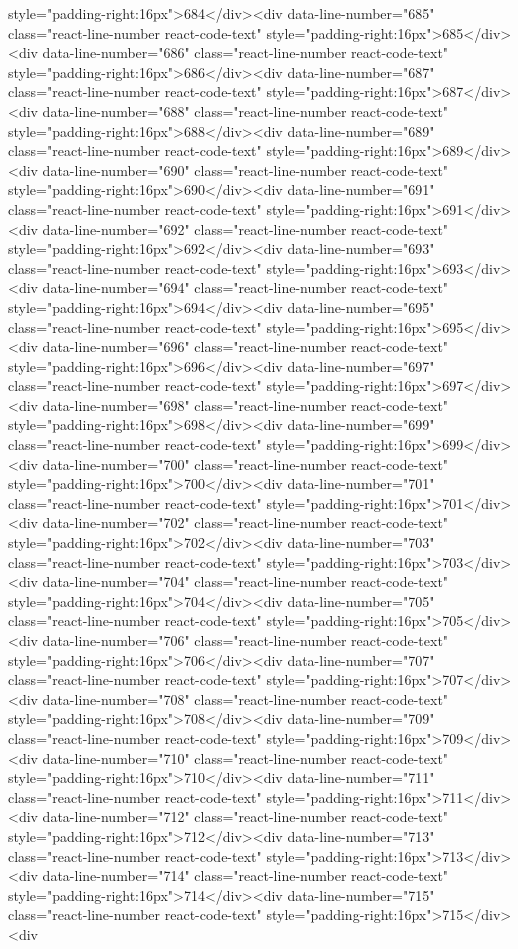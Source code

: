 style="padding-right:16px">684</div><div data-line-number="685" class="react-line-number react-code-text" style="padding-right:16px">685</div><div data-line-number="686" class="react-line-number react-code-text" style="padding-right:16px">686</div><div data-line-number="687" class="react-line-number react-code-text" style="padding-right:16px">687</div><div data-line-number="688" class="react-line-number react-code-text" style="padding-right:16px">688</div><div data-line-number="689" class="react-line-number react-code-text" style="padding-right:16px">689</div><div data-line-number="690" class="react-line-number react-code-text" style="padding-right:16px">690</div><div data-line-number="691" class="react-line-number react-code-text" style="padding-right:16px">691</div><div data-line-number="692" class="react-line-number react-code-text" style="padding-right:16px">692</div><div data-line-number="693" class="react-line-number react-code-text" style="padding-right:16px">693</div><div data-line-number="694" class="react-line-number react-code-text" style="padding-right:16px">694</div><div data-line-number="695" class="react-line-number react-code-text" style="padding-right:16px">695</div><div data-line-number="696" class="react-line-number react-code-text" style="padding-right:16px">696</div><div data-line-number="697" class="react-line-number react-code-text" style="padding-right:16px">697</div><div data-line-number="698" class="react-line-number react-code-text" style="padding-right:16px">698</div><div data-line-number="699" class="react-line-number react-code-text" style="padding-right:16px">699</div><div data-line-number="700" class="react-line-number react-code-text" style="padding-right:16px">700</div><div data-line-number="701" class="react-line-number react-code-text" style="padding-right:16px">701</div><div data-line-number="702" class="react-line-number react-code-text" style="padding-right:16px">702</div><div data-line-number="703" class="react-line-number react-code-text" style="padding-right:16px">703</div><div data-line-number="704" class="react-line-number react-code-text" style="padding-right:16px">704</div><div data-line-number="705" class="react-line-number react-code-text" style="padding-right:16px">705</div><div data-line-number="706" class="react-line-number react-code-text" style="padding-right:16px">706</div><div data-line-number="707" class="react-line-number react-code-text" style="padding-right:16px">707</div><div data-line-number="708" class="react-line-number react-code-text" style="padding-right:16px">708</div><div data-line-number="709" class="react-line-number react-code-text" style="padding-right:16px">709</div><div data-line-number="710" class="react-line-number react-code-text" style="padding-right:16px">710</div><div data-line-number="711" class="react-line-number react-code-text" style="padding-right:16px">711</div><div data-line-number="712" class="react-line-number react-code-text" style="padding-right:16px">712</div><div data-line-number="713" class="react-line-number react-code-text" style="padding-right:16px">713</div><div data-line-number="714" class="react-line-number react-code-text" style="padding-right:16px">714</div><div data-line-number="715" class="react-line-number react-code-text" style="padding-right:16px">715</div><div 